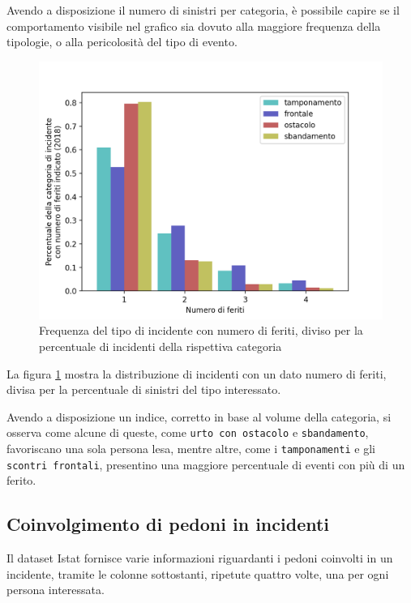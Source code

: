 \documentclass[a4paper,12pt]{report}
\newcommand{\columnstyle}[1]{\texttt{#1}}
\begin{document}
Avendo a disposizione il numero di sinistri per categoria, è possibile capire 
se il comportamento visibile nel grafico sia dovuto alla maggiore frequenza della tipologie, 
o alla pericolosità del tipo di evento. 

\begin{figure}
    \includegraphics[width=\linewidth]{../src/incidenti/incidenti_senza_coords/natura_incidente/perc_natura_incidente.png}
    \caption{Frequenza del tipo di incidente con numero di feriti, diviso per la percentuale di incidenti della rispettiva categoria}
    \label{fig:perc-numero-feriti}
\end{figure}

La figura \ref{fig:perc-numero-feriti} mostra la distribuzione di incidenti con un dato numero 
di feriti, divisa per la percentuale di sinistri del tipo interessato. 

Avendo a disposizione un indice, corretto in base al volume della categoria, 
si osserva come alcune di queste, come \columnstyle{urto con ostacolo} 
e \columnstyle{sbandamento}, favoriscano una sola persona lesa, mentre altre, 
come i \columnstyle{tamponamenti} e gli \columnstyle{scontri frontali}, presentino 
una maggiore percentuale di eventi con più di un ferito. 

\subsection{Coinvolgimento di pedoni in incidenti}

Il dataset Istat fornisce varie informazioni riguardanti i pedoni coinvolti in un 
incidente, tramite le colonne sottostanti, ripetute quattro volte, 
una per ogni persona interessata.
\end{document}

